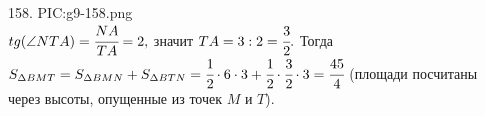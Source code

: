 158. {{PIC:g9-158.png}}\\
$tg(\angle NTA)=\cfrac{NA}{TA}=2,$ значит $TA=3:2=\cfrac{3}{2}.$ Тогда $S_{\Delta BMT}=S_{\Delta BMN}+S_{\Delta BTN}=\cfrac{1}{2}\cdot6\cdot3+\cfrac{1}{2}\cdot\cfrac{3}{2}\cdot3=\cfrac{45}{4}$ (площади посчитаны через высоты, опущенные из точек $M$ и $T$).\\
